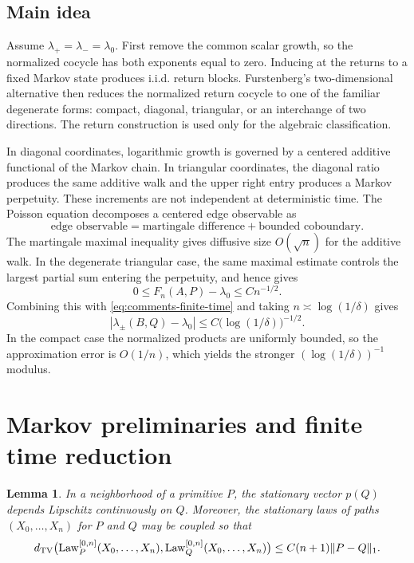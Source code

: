 \documentclass[11pt,a4paper]{amsart}
\newtheorem{lemma}[theorem]{Lemma}
\theoremstyle{definition}
\theoremstyle{remark}
\numberwithin{equation}{section}
\newcommand{\Law}{\operatorname{Law}}
\newcommand{\1}{\boldsymbol 1}
\begin{document}
\subsection{Main idea}

Assume $\lambda_+=\lambda_-=\lambda_0$.  First remove the common
scalar growth, so the normalized cocycle has both exponents equal to
zero.  Inducing at the returns to a fixed Markov state produces i.i.d.
return blocks.  Furstenberg's two-dimensional alternative then reduces
the normalized return cocycle to one of the familiar degenerate forms:
compact, diagonal, triangular, or an interchange of two directions.
The return construction is used only for the algebraic classification.

In diagonal coordinates, logarithmic growth is governed by a centered
additive functional of the Markov chain.  In triangular coordinates,
the diagonal ratio produces the same additive walk and the upper right
entry produces a Markov perpetuity.  These increments are not
independent at deterministic time.  The Poisson equation decomposes a
centered edge observable as
$$
 \text{edge observable}
 =\text{martingale difference}+\text{bounded coboundary}.
$$
The martingale maximal inequality gives diffusive size $O(\sqrt n)$
for the additive walk.  In the degenerate triangular case, the same
maximal estimate controls the largest partial sum entering the
perpetuity, and hence gives
$$
 0\le F_n(A,P)-\lambda_0\le Cn^{-1/2}.
$$
Combining this with \eqref{eq:comments-finite-time} and taking
$n\asymp\log(1/\delta)$ gives
$$
 |\lambda_\pm(B,Q)-\lambda_0|
 \le C\bigl(\log(1/\delta)\bigr)^{-1/2}.
$$
In the compact case the normalized products are uniformly bounded, so
the approximation error is $O(1/n)$, which yields the stronger
$(\log(1/\delta))^{-1}$ modulus.


\section{Markov preliminaries and finite time reduction}
\label{sec:prelim}

\begin{lemma}
\label{lem:path-laws}
In a neighborhood of a primitive $P$, the stationary vector
$p(Q)$ depends Lipschitz continuously on $Q$.  Moreover, the
stationary laws of paths $(X_0,\ldots,X_n)$ for $P$ and $Q$ may
be coupled so that
\begin{equation}\label{eq:path-tv}
 d_{\rm TV}\bigl(\Law_P^{[0,n]}(X_0,\ldots,X_n),
                   \Law_Q^{[0,n]}(X_0,\ldots,X_n)\bigr)
 \le C(n+1)\|P-Q\|_1.
\end{equation}
\end{lemma}
\end{document}

